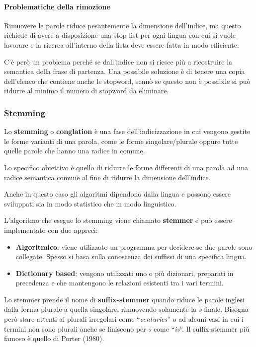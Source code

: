 \paragraph{Problematiche della rimozione}

Rimuovere le parole riduce pesantemente la dimensione dell'indice, ma questo richiede di avere a disposizione una stop list per ogni lingua con cui si vuole lavorare e la ricerca all'interno della lista deve essere fatta in modo efficiente.

C'è però un problema perché se dall'indice non si riesce più a ricostruire la semantica della frase di partenza. Una possibile soluzione è di tenere una copia dell'elenco che contiene anche le stopword, sennò se questo non è possibile si può ridurre al minimo il numero di stopword da eliminare.

\subsubsection{Stemming}

Lo \textbf{stemming} o \textbf{conglation} è una fase dell'indicizzazione in cui vengono gestite le forme varianti di una parola, come le forme singolare/plurale oppure tutte quelle parole che hanno una radice in comune.

Lo specifico obiettivo è quello di ridurre le forme differenti di una parola ad una radice semantica comune al fine di ridurre la dimensione dell'indice.

Anche in questo caso gli algoritmi dipendono dalla lingua e possono essere sviluppati sia in modo statistico che in modo linguistico.

L'algoritmo che esegue lo stemming viene chiamato \textbf{stemmer} e può essere implementato con due apprcci:

\begin{itemize}
	\item \textbf{Algoritmico}: viene utilizzato un programma per decidere se due parole sono collegate. Spesso si basa sulla conoscenza dei suffissi di una specifica lingua.
	\item \textbf{Dictionary based}: vengono utilizzati uno o più dizionari, preparati in precedenza e che mantengono le relazioni esistenti tra i vari termini.
\end{itemize}

Lo stemmer prende il nome di \textbf{suffix-stemmer} quando riduce le parole inglesi dalla forma plurale a quella singolare, rimuovendo solamente la \textit{s} finale. Bisogna però stare attenti ai plurali irregolari come ``\textit{centuries}'' o ad alcuni casi in cui i termini non sono plurali anche se finiscono per \textit{s} come ``\textit{is}''. Il suffix-stemmer più famoso è quello di Porter (1980).

